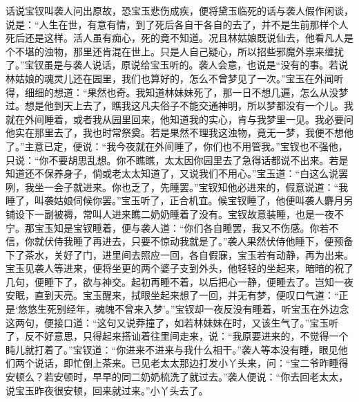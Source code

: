 


\begin{parag}
    话说宝钗叫袭人问出原故，恐宝玉悲伤成疾，便将黛玉临死的话与袭人假作闲谈，说是：“人生在世，有意有情，到了死后各自干各自的去了，并不是生前那样个人死后还是这样。活人虽有痴心，死的竟不知道。况且林姑娘既说仙去，他看凡人是个不堪的浊物，那里还肯混在世上。只是人自己疑心，所以招些邪魔外祟来缠扰了。”宝钗虽是与袭人说话，原说给宝玉听的。袭人会意，也说是“没有的事。若说林姑娘的魂灵儿还在园里，我们也算好的，怎么不曾梦见了一次。”宝玉在外闻听得，细细的想道：“果然也奇。我知道林妹妹死了，那一日不想几遍，怎么从没梦过。想是他到天上去了，瞧我这凡夫俗子不能交通神明，所以梦都没有一个儿。我就在外间睡着，或者我从园里回来，他知道我的实心，肯与我梦里一见。我必要问他实在那里去了，我也时常祭奠。若是果然不理我这浊物，竟无一梦，我便不想他了。”主意已定，便说：“我今夜就在外间睡了，你们也不用管我。”宝钗也不强他，只说：“你不要胡思乱想。你不瞧瞧，太太因你园里去了急得话都说不出来。若是知道还不保养身子，倘或老太太知道了，又说我们不用心。”宝玉道：“白这么说罢咧，我坐一会子就进来。你也乏了，先睡罢。”宝钗知他必进来的，假意说道：“我睡了，叫袭姑娘伺候你罢。”宝玉听了，正合机宜。候宝钗睡了，他便叫袭人麝月另铺设下一副被褥，常叫人进来瞧二奶奶睡着了没有。宝钗故意装睡，也是一夜不宁。那宝玉知是宝钗睡着，便与袭人道：“你们各自睡罢，我又不伤感。你若不信，你就伏侍我睡了再进去，只要不惊动我就是了。”袭人果然伏侍他睡下，便预备下了茶水，关好了门，进里间去照应一回，各自假寐，宝玉若有动静，再为出来。宝玉见袭人等进来，便将坐更的两个婆子支到外头，他轻轻的坐起来，暗暗的祝了几句，便睡下了，欲与神交。起初再睡不着，以后把心一静，便睡去了。岂知一夜安眠，直到天亮。宝玉醒来，拭眼坐起来想了一回，并无有梦，便叹口气道：“正是‘悠悠生死别经年，魂魄不曾来入梦’。”宝钗却一夜反没有睡着，听宝玉在外边念这两句，便接口道：“这句又说莽撞了，如若林妹妹在时，又该生气了。”宝玉听了，反不好意思，只得起来搭讪着往里间走来，说：“我原要进来的，不觉得一个盹儿就打着了。”宝钗道：“你进来不进来与我什么相干。”袭人等本没有睡，眼见他们两个说话，即忙倒上茶来。已见老太太那边打发小丫头来，问：“宝二爷昨睡得安顿么？若安顿时，早早的同二奶奶梳洗了就过去。”袭人便说：“你去回老太太，说宝玉昨夜很安顿，回来就过来。”小丫头去了。
\end{parag}


